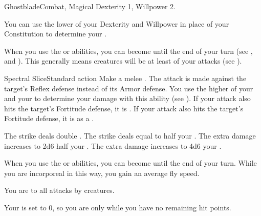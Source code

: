   \begin{magicalfeat}{Ghostblade}{Combat, Magical}
    \featpre Dexterity 1, Willpower 2.

     You can use the lower of your Dexterity and Willpower in place of your Constitution to determine your .

     When you use the  or  abilities, you can become  until the end of your turn (see , and ).
    This generally means creatures will be at least \partiallyunaware of your attacks (see ).

    \begin{magicalactiveability}{Spectral Slice}{Standard action}
      \rankline
      Make a melee .
      The attack is made against the target's Reflex defense instead of its Armor defense.
      You use the higher of your  and your  to determine your damage with this ability (see ).
      \hit If your attack also hits the target's Fortitude defense, it is \briefly \slowed.
      \injury If your attack also hits the target's Fortitude defense, it is \slowed as a .

      \rankline
       The strike deals double .
       The strike deals  equal to half your .
       The extra damage increases to 2d6 \add half your .
       The extra damage increases to 4d6 \add your .
    \end{magicalactiveability}

     When you use the  or  abilities, you can become  until the end of your turn.
    While you are incorporeal in this way, you gain an average fly speed.

     You are \resistant to all attacks by  creatures.

     Your  is set to 0, so you are only  while you have no remaining hit points.
  \end{magicalfeat}

